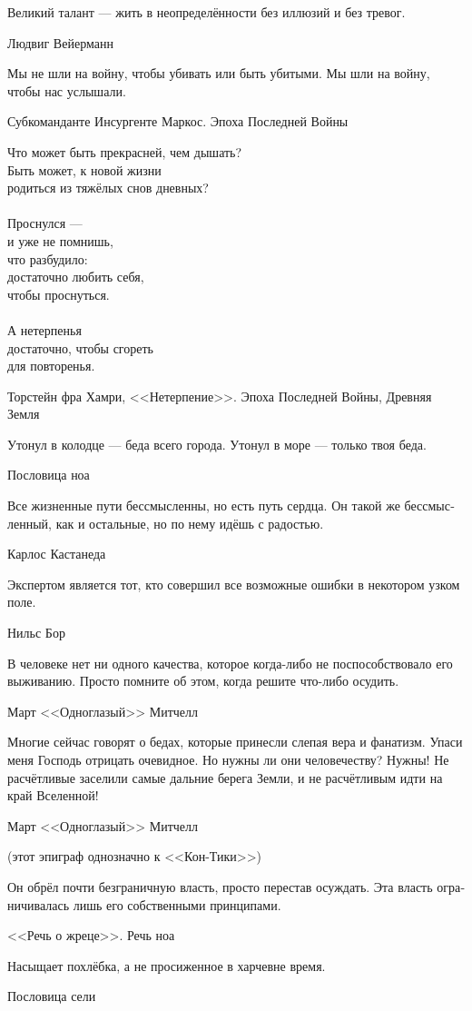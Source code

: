 \documentclass[a4paper,12pt,fleqn]{book}\usepackage{polyglossia}\setdefaultlanguage[babelshorthands=true]{russian}\setotherlanguage{english}\defaultfontfeatures{Ligatures=TeX,Mapping=tex-text}\usepackage{xcolor}\newcommand{\ml}[3]{#2}
\begin{document}
{\epigraph
{Великий талант --- жить в неопределённости без иллюзий и без тревог.}
{Людвиг Вейерманн}

\epigraph
{Мы не шли на войну, чтобы убивать или быть убитыми.
Мы шли на войну, чтобы нас услышали.}
{Субкоманданте Инсургенте Маркос.
Эпоха Последней Войны}

\epigraph
{Что может быть прекрасней, чем дышать?\\
Быть может, к новой жизни\\
родиться из тяжёлых снов дневных?\\
~\\
Проснулся ---\\
и уже не помнишь,\\
что разбудило:\\
достаточно любить себя,\\
чтобы проснуться.\\
~\\
А нетерпенья\\
достаточно, чтобы сгореть\\
для повторенья.}
{Торстейн фра Хамри, <<Нетерпение>>.
Эпоха Последней Войны, Древняя Земля}

\epigraph
{Утонул в колодце --- беда всего города.
Утонул в море --- только твоя беда.}
{Пословица ноа}

\epigraph
{Все жизненные пути бессмысленны, но есть путь сердца.
Он такой же бессмысленный, как и остальные, но по нему идёшь с радостью.}
{Карлос Кастанеда}

\epigraph
{Экспертом является тот, кто совершил все возможные ошибки в некотором узком поле.}
{Нильс Бор}

\epigraph
{В человеке нет ни одного качества, которое когда-либо не поспособствовало его выживанию.
Просто помните об этом, когда решите что-либо осудить.}
{Март <<Одноглазый>> Митчелл}

\epigraph
{Многие сейчас говорят о бедах, которые принесли слепая вера и фанатизм.
Упаси меня Господь отрицать очевидное.
Но нужны ли они человечеству?
Нужны!
Не расчётливые заселили самые дальние берега Земли, и не расчётливым идти на край Вселенной!}
{Март <<Одноглазый>> Митчелл}

(этот эпиграф однозначно к <<Кон-Тики>>)

\epigraph
{Он обрёл почти безграничную власть, просто перестав осуждать.
Эта власть ограничивалась лишь его собственными принципами.}
{<<Речь о жреце>>.
Речь ноа}

\epigraph
{Насыщает похлёбка, а не просиженное в харчевне время.}
{Пословица сели}

}
\end{document}
